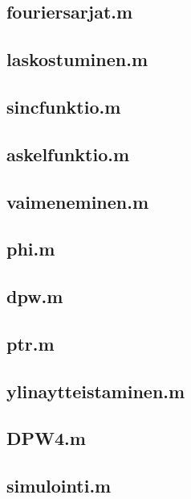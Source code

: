 \documentclass[finnish,12pt,a4paper,pdftex]{article} %
\begin{document}
\subsection*{fouriersarjat.m}
\vspace{-5mm}

\vspace{6mm}
\subsection*{laskostuminen.m}
\vspace{-5mm}

\vspace{6mm}
\subsection*{sincfunktio.m}
\vspace{-5mm}

\vspace{6mm}
\subsection*{askelfunktio.m}
\vspace{-5mm}

\vspace{6mm}
\subsection*{vaimeneminen.m}
\vspace{-5mm}

\vspace{6mm}
\subsection*{phi.m}
\vspace{-5mm}

\vspace{6mm}
\subsection*{dpw.m}
\vspace{-5mm}

\vspace{6mm}
\subsection*{ptr.m}
\vspace{-5mm}

\vspace{6mm}
\subsection*{ylinaytteistaminen.m}
\vspace{-5mm}

\vspace{6mm}
\subsection*{DPW4.m}
\vspace{-5mm}

\vspace{6mm}
\subsection*{simulointi.m}
\vspace{-5mm}

\end{document}
